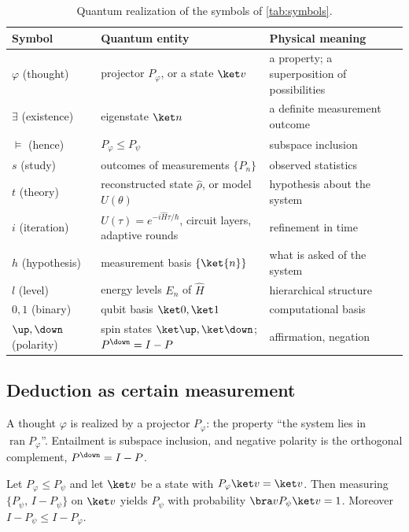 \begin{table}[ht]
\centering\small
\begin{tabular}{@{}l>{\raggedright}p{}>{\raggedright\arraybackslash}p{}@{}}
\toprule
Symbol & Quantum entity & Physical meaning \\
\midrule
$\varphi$ (thought) & projector $P_\varphi$, or a state $\ket v$ & a property; a superposition of possibilities \\
$\exists$ (existence) & eigenstate $\ket n$ & a definite measurement outcome \\
$\models$ (hence) & $P_\varphi\le P_\psi$ & subspace inclusion \\
$s$ (study) & outcomes of measurements $\{P_n\}$ & observed statistics \\
$t$ (theory) & reconstructed state $\hat\rho$, or model $U(\theta)$ & hypothesis about the system \\
$i$ (iteration) & $U(\tau)=e^{-i\hat H\tau/\hbar}$, circuit layers, adaptive rounds & refinement in time \\
$h$ (hypothesis) & measurement basis $\{\ket{n}\}$ & what is asked of the system \\
$l$ (level) & energy levels $E_n$ of $\hat H$ & hierarchical structure \\
$0,1$ (binary) & qubit basis $\ket0,\ket1$ & computational basis \\
$\up,\down$ (polarity) & spin states $\ket\up,\ket\down$; $P^{\down}=I-P$ & affirmation, negation \\
\bottomrule
\end{tabular}
\caption{Quantum realization of the symbols of \cref{tab:symbols}.}
\label{tab:quantum}
\end{table}

\subsection{Deduction as certain measurement}

A thought $\varphi$ is realized by a projector $P_\varphi$: the property ``the system lies in
$\operatorname{ran}P_\varphi$''. Entailment is subspace inclusion, and negative polarity is the
orthogonal complement, $P^{\down}=I-P$.

\begin{proposition}\label{prop:qsound}
Let $P_\varphi\le P_\psi$ and let $\ket v$ be a state with $P_\varphi\ket v=\ket v$. Then measuring
$\{P_\psi,\,I-P_\psi\}$ on $\ket v$ yields $P_\psi$ with probability
$\bra v P_\psi\ket v=1$. Moreover $I-P_\psi\le I-P_\varphi$.
\end{proposition}

